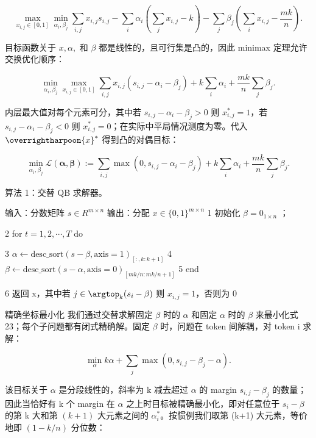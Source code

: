\documentclass[
  10
]{article}
\begin{document}
\[
\max _ {x _ {i, j} \in [ 0, 1 ]} \min _ {\alpha_ {i}, \beta_ {j}} \sum_ {i, j} x _ {i, j} s _ {i, j} - \sum_ {i} \alpha_ {i} \left(\sum_ {j} x _ {i, j} - k\right) - \sum_ {j} \beta_ {j} \left(\sum_ {i} x _ {i, j} - \frac {m k}{n}\right).\tag{21}
\]

目标函数关于 \({ \mathbf { } } x , \alpha ,\) 和 \(\beta\) 都是线性的，且可行集是凸的，因此 minimax 定理允许交换优化顺序：

\[
\min _ {\alpha_ {i}, \beta_ {j}} \max _ {x _ {i, j} \in [ 0, 1 ]} \sum_ {i, j} x _ {i, j} \left(s _ {i, j} - \alpha_ {i} - \beta_ {j}\right) + k \sum_ {i} \alpha_ {i} + \frac {m k}{n} \sum_ {j} \beta_ {j}.\tag{22}
\]

内层最大值对每个元素可分，其中若 \(s _ { i , j } - \alpha _ { i } - \beta _ { j } > 0\) 则 \(x _ { i , j } ^ { * } = 1\)，若 \(s _ { i , j } - \alpha _ { i } - \beta _ { j } < 0\) 则 \(x _ { i , j } ^ { * } = 0\)；在实际中平局情况测度为零。代入 \(\overrightharpoon { x } ^ { * }\) 得到凸的对偶目标：

\[
\min _ {\alpha_ {i}, \beta_ {j}} \mathcal {L} (\boldsymbol {\alpha}, \boldsymbol {\beta}) := \sum_ {i, j} \max \left(0, s _ {i, j} - \alpha_ {i} - \beta_ {j}\right) + k \sum_ {i} \alpha_ {i} + \frac {m k}{n} \sum_ {j} \beta_ {j}.\tag{23}
\]

算法 1：交替 QB 求解器。

输入：分数矩阵 \(s \in R^{m \times n}\) 输出：分配 \(x \in \{0, 1\}^{m \times n}\) 1 初始化 \(\beta = 0_{1 \times n}\) ；

2 for \(t = 1, 2, \cdots, T\) do

3
\(\alpha \leftarrow \text{desc\_sort}(s - \beta, \text{axis}=1)_{[:, k:k+1]}\)
4
\(\beta \leftarrow \text{desc\_sort}(s - \alpha, \text{axis}=0)_{[mk/n:mk/n+1]}\)
5 end

6 返回 x，其中若 \(j \in \argtop_k(s_i - \beta)\) 则 \(x_{i,j} = 1\)，否则为 0

精确坐标最小化 我们通过交替求解固定 \(\beta\) 时的 \(\alpha\) 和固定 \(\alpha\) 时的 \(\beta\) 来最小化式 23；每个子问题都有闭式精确解。固定 \(\beta\) 时，问题在 token 间解耦，对 token i 求解：

\[
\min _ {\alpha} k \alpha + \sum_ {j} \max \left(0, s _ {i, j} - \beta_ {j} - \alpha\right).\tag{24}
\]

该目标关于 \(\alpha\) 是分段线性的，斜率为 k 减去超过 \(\alpha\) 的 margin \(s _ { i , j } - \beta _ { j }\) 的数量；因此当恰好有 k 个 margin 在 \(\alpha\) 之上时目标被精确最小化，即对任意位于 \(s _ { i } - \beta\) 的第 k 大和第 \((k+1)\) 大元素之间的 \(\alpha _ { i } ^ { * }\)。按惯例我们取第 (k+1) 大元素，等价地即 \(( 1 - k / n )\) 分位数：
\end{document}

